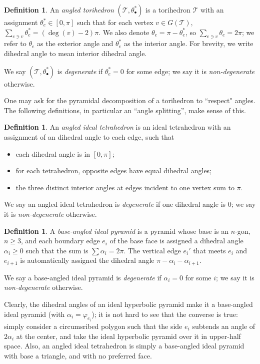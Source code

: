 \documentclass[11pt]{amsart}
\newcommand{\sT}{{\mathcal{T}}}
\newcommand{\vphi}{\varphi}
\theoremstyle{plain}
\theoremstyle{definition}
\newtheorem{define}[theorem]{Definition}
\newtheorem{definition}[theorem]{Definition}
\begin{document}
\begin{definition}
An \emph{angled torihedron} $(\sT, \theta_\bullet^*)$
is a torihedron $\sT$ with
an assignment $\theta_e^* \in [0,\pi]$
such that for each vertex $v \in G(\sT)$,
$\sum_{e \ni v} \theta_e^* = (\deg(v) - 2)\pi$.
We also denote $\theta_e = \pi - \theta_e^*$,
so $\sum_{e \ni v} \theta_e = 2\pi$;
we refer to $\theta_e$ as the exterior angle
and $\theta_e^*$ as the interior angle. 
For brevity, we write dihedral angle to mean 
interior dihedral angle.  


We say $(\sT, \theta_\bullet^*)$ is \emph{degenerate}
if $\theta_e^* = 0$ for some edge;
we say it is \emph{non-degenerate} otherwise.
\end{definition}


One may ask for the pyramidal decomposition of a torihedron
to ``respect" angles. The following definitions,
in particular an ``angle splitting'', make sense of this.

\begin{define}
An \emph{angled ideal tetrahedron} is an ideal tetrahedron with an assignment of an
dihedral angle to each edge, such that
\begin{itemize}
\item each dihedral angle is in $[0, \pi]$;
\item for each tetrahedron, opposite edges have equal dihedral angles;
\item the three distinct interior angles at edges incident to one vertex sum to $\pi$.
\end{itemize}

We say an angled ideal tetrahedron is \emph{degenerate} if
one dihedral angle is 0; we say it is \emph{non-degenerate} otherwise.
\end{define}


\begin{define}
A \emph{base-angled ideal pyramid}
is a pyramid whose base is an $n$-gon, $n \geq 3$,
and each boundary edge $e_i$ of the base face is assigned a dihedral angle
$\alpha_i \geq 0$ such that the sum is $\sum \alpha_i = 2\pi$.
The vertical edge $e_i'$ that meets $e_i$ and $e_{i+1}$
is automatically assigned the dihedral angle $\pi - \alpha_i - \alpha_{i+1}$.


We say a base-angled ideal pyramid is \emph{degenerate} if
$\alpha_i = 0$ for some $i$; we say it is \emph{non-degenerate} otherwise.
\end{define}


Clearly, the dihedral angles of an ideal hyperbolic pyramid
make it a base-angled ideal pyramid
(with $\alpha_i = \vphi_{e_i}$);
it is not hard to see that the converse is true:
simply consider a circumsribed polygon such that the side $e_i$
subtends an angle of $2\alpha_i$ at the center,
and take the ideal hyperbolic pyramid over it in upper-half space.
Also, an angled ideal tetrahedron is simply a base-angled ideal pyramid
with base a triangle, and with no preferred face.
\end{document}
